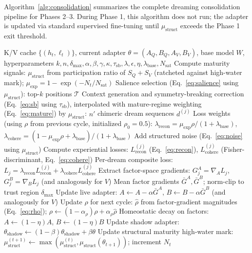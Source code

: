 \documentclass[11pt]{article}
\begin{document}
Algorithm~\ref{alg:consolidation} summarizes the complete dreaming consolidation pipeline for Phases 2--3. During Phase 1, this algorithm does not run; the adapter is updated via standard supervised fine-tuning until $\mu_\text{struct}$ exceeds the Phase 1 exit threshold.

\begin{algorithm}[t]
\caption{Dreaming Consolidation (Phases 2--3)}
\label{alg:consolidation}
\begin{algorithmic}[1]
\REQUIRE K/V cache $\{(h_t, \ell_t)\}$, current adapter $\theta = (A_Q, B_Q, A_V, B_V)$, base model $W$, hyperparameters $k, n, \delta_{\max}, \alpha, \beta, \gamma, \kappa, \tau_\text{sb}, \lambda, \epsilon, \eta, \lambda_\text{base}, N_\text{sat}$
\STATE Compute maturity signals: $\mu_\text{struct}$ from participation ratio of $S_Q + S_V$ (ratcheted against high-water mark); $\mu_\text{exp} = 1 - \exp(-N_t / N_\text{sat})$
\STATE Salience selection (Eq.~\eqref{eq:salience} using $\mu_\text{struct}$): top-$k$ positions $\mathcal{T}$
\STATE Context generation and symmetry-breaking correction (Eq.~\eqref{eq:sb} using $\tau_\text{sb}$), interpolated with mature-regime weighting (Eq.~\eqref{eq:mature}) by $\mu_\text{struct}$: $n'$ chimeric dream sequences $d^{(j)}$
\STATE Loss weights (using $\rho$ from previous cycle, initialized $\rho_0 = 0.5$): $\lambda_\text{recon} = \mu_\text{exp} \rho / (1 + \lambda_\text{base})$, $\lambda_\text{cohere} = (1 - \mu_\text{exp} \rho + \lambda_\text{base}) / (1 + \lambda_\text{base})$
    \STATE Add structured noise (Eq.~\eqref{eq:noise} using $\mu_\text{struct}$)
    \STATE Compute experiential losses: $L_\text{recon}^{(j)}$ (Eq.~\eqref{eq:recon}), $L_\text{cohere}^{(j)}$ (Fisher-discriminant, Eq.~\eqref{eq:cohere})
\ENDFOR
\STATE Per-dream composite loss: $L_j = \lambda_\text{recon} L_\text{recon}^{(j)} + \lambda_\text{cohere} L_\text{cohere}^{(j)}$
\STATE Extract factor-space gradients: $G_j^A = \nabla_A L_j$, $G_j^B = \nabla_B L_j$ (and analogously for $V$)
\STATE Mean factor gradients $\bar{G}^A, \bar{G}^B$; norm-clip to trust region $\delta_{\max}$
\STATE Update live adapter: $A \gets A - \alpha \bar{G}^A$, $B \gets B - \alpha \bar{G}^B$ (and analogously for $V$)
\STATE Update $\rho$ for next cycle: $\hat{\rho}$ from factor-gradient magnitudes (Eq.~\eqref{eq:rho}); $\rho \gets (1 - \alpha_\rho) \rho + \alpha_\rho \hat{\rho}$
\STATE Homeostatic decay on factors: $A \gets (1 - \eta) A$, $B \gets (1 - \eta) B$
\STATE Update shadow adapter: $\theta_\text{shadow} \gets (1 - \beta) \theta_\text{shadow} + \beta \theta$
\STATE Update structural maturity high-water mark: $\mu_\text{struct}^{(t+1)} \gets \max(\mu_\text{struct}^{(t)}, \mu_\text{struct}(\theta_{t+1}))$; increment $N_t$
\end{algorithmic}
\end{algorithm}
\end{document}
